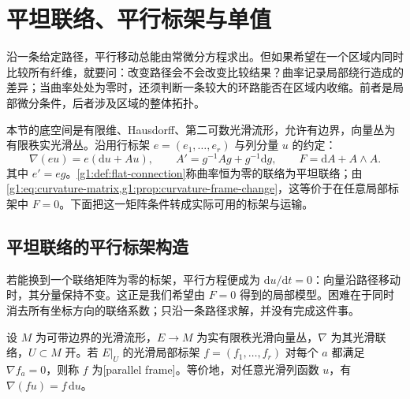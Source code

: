 
% 
% 
% 

\section{平坦联络、平行标架与单值}
\label{g1:sec:1505}

沿一条给定路径，平行移动总能由常微分方程求出。但如果希望在一个区域内同时比较所有纤维，就要问：改变路径会不会改变比较结果？曲率记录局部绕行造成的差异；当曲率处处为零时，还须判断一条较大的环路能否在区域内收缩。前者是局部微分条件，后者涉及区域的整体拓扑。

\ProseParagraphBreak

本节的底空间是有限维、Hausdorff、第二可数光滑流形，允许有边界，向量丛为有限秩实光滑丛。沿用行标架 \(e=(e_1,\ldots,e_r)\) 与列分量 \(u\) 的约定：
\[
	\nabla(eu)=e(\mathrm{d}u+A u),\qquad
	A'=g^{-1}Ag+g^{-1}\mathrm{d}g,\qquad
	F=\mathrm{d}A+A\wedge A.
\]
其中 \(e'=eg\)。\cref{g1:def:flat-connection}称曲率恒为零的联络为平坦联络；由\cref{g1:eq:curvature-matrix,g1:prop:curvature-frame-change}，这等价于在任意局部标架中 \(F=0\)。下面把这一矩阵条件转成实际可用的标架与运输。

\subsection{平坦联络的平行标架构造}
\label{g1:subsec:1505:01}

若能换到一个联络矩阵为零的标架，平行方程便成为 \(\mathrm{d}u/\mathrm{d}t=0\)：向量沿路径移动时，其分量保持不变。这正是我们希望由 \(F=0\) 得到的局部模型。困难在于同时消去所有坐标方向的联络系数；只沿一条路径求解，并没有完成这件事。

\begin{definition}
	\label{g1:def:parallel-frame}
	设 \(M\) 为可带边界的光滑流形，\(E\to M\) 为实有限秩光滑向量丛，\(\nabla\) 为其光滑联络，\(U\subset M\) 开。若 \(E|_U\) 的光滑局部标架 \(f=(f_1,\ldots,f_r)\) 对每个 \(a\) 都满足 \(\nabla f_a=0\)，则称 \(f\) 为[parallel frame]。等价地，对任意光滑列函数 \(u\)，有 \(\nabla(fu)=f\,\mathrm{d}u\)。
\end{definition}

